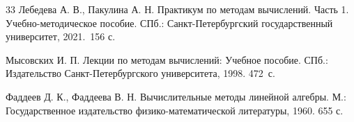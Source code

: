 \documentclass[12pt]{article}
\begin{document}
    \renewcommand{\bibname}{{Список литературы}}
    
    \begin{thebibliography}{33}
        Лебедева А. В., Пакулина А. Н. Практикум по методам вычислений. Часть 1. Учебно-методическое пособие. СПб.: Санкт-Петербургский государственный университет, 2021.~156 с.
        
        Мысовских И. П. Лекции по методам вычислений: Учебное пособие. СПб.: Издательство Санкт-Петербургского университета, 1998. 472~с.
        
        Фаддеев Д. К., Фаддеева В. Н. Вычислительные методы линейной алгебры. М.:  Государственное издательство физико-математической литературы, 1960. 655 с.
    \end{thebibliography}
\end{document}
